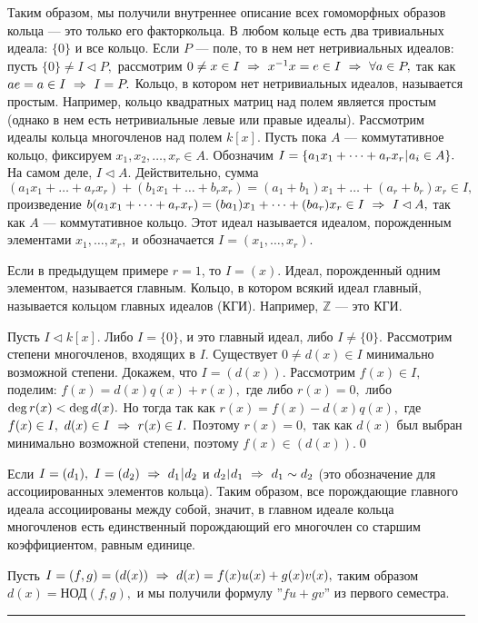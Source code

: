 Таким образом, мы получили внутреннее описание всех гомоморфных образов кольца --- это только его факторкольца. В любом кольце есть два тривиальных идеала:
$\{0\}$ и все кольцо. Если $P$ --- поле, то в нем нет нетривиальных идеалов: пусть $\{0\}\ne I\lhd P,$ рассмотрим $0\ne x\in I\ \Rightarrow\  x^{-1}x=e\in I\ \Rightarrow\ \forall a\in P,$ так как
$ae=a\in I\ \Rightarrow\  I=P.$ Кольцо, в котором нет нетривиальных идеалов, называется простым. Например, кольцо квадратных матриц над полем является простым (однако в нем
есть нетривиальные левые или правые идеалы). Рассмотрим идеалы кольца многочленов над полем $k[x]$.
Пусть пока $A$ --- коммутативное кольцо, фиксируем $x_1, x_2, \dots, x_r\in A$. Обозначим $I=\{a_1x_1+\dots+a_rx_r\,\vrule\, a_i\in A\}.$
На самом деле, $I\lhd A.$ Действительно, сумма $(a_1x_1+\dots+a_rx_r)+(b_1x_1+\dots+b_rx_r)=(a_1+b_1)x_1+\dots+(a_r+b_r)x_r\in I,$ произведение
$b(a_1x_1+\dots+a_rx_r)=(ba_1)x_1+\dots+(ba_r)x_r\in I\ \Rightarrow\  I\lhd A,$ так как $A$ --- коммутативное кольцо. Этот идеал называется идеалом, порожденным
элементами $x_1, \dots, x_r,$ и обозначается $I=(x_1, \dots, x_r).$

Если в предыдущем примере $r=1$, то $I=(x).$ Идеал, порожденный одним элементом, называется главным. Кольцо, в котором всякий идеал главный,
называется кольцом главных идеалов (КГИ). Например, $\mathbb Z$ --- это КГИ.

\dok Пусть $I\lhd k[x].$ Либо $I=\{0\}$, и это главный идеал, либо $I\ne\{0\}.$ Рассмотрим степени многочленов, входящих в $I$.
Существует $0\ne d(x)\in I$ минимально возможной степени. Докажем, что $I=(d(x))$. Рассмотрим $f(x)\in I,$ поделим: $f(x)=d(x)q(x)+r(x),$ где
либо $r(x)=0,$ либо ${\rm deg}\,r(x)<{\rm deg}\,d(x).$ Но тогда так как $r(x)=f(x)-d(x)q(x),$ где $f(x)\in I,\ d(x)\in I\ \Rightarrow\  r(x)\in I.$ Поэтому $r(x)=0,$
так как $d(x)$ был выбран минимально возможной степени, поэтому $f(x)\in (d(x)).$\quad\qed

Если $I=(d_1),\ I=(d_2)\ra d_1\,\vrule\,d_2$ и $d_2\,\vrule\,d_1\ra d_1\sim d_2$ (это обозначение для ассоциированных элементов кольца).
Таким образом, все порождающие главного идеала ассоциированы между собой, значит, в главном идеале кольца многочленов есть единственный порождающий его
многочлен со старшим коэффициентом, равным единице.

Пусть $I=(f, g)=(d(x))\ \Rightarrow\  d(x)=f(x)u(x)+g(x)v(x),$ таким образом $d(x)=\mbox{НОД}(f, g),$ и мы получили формулу ''$fu+gv$'' из первого семестра.
\smallskip
\hrule
\rule{0pt}{10pt}


